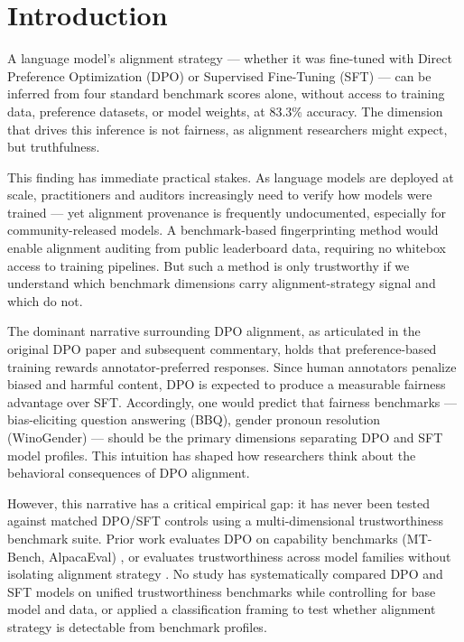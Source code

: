 \section{Introduction}

A language model's alignment strategy --- whether it was fine-tuned with Direct Preference
Optimization (DPO) or Supervised Fine-Tuning (SFT) --- can be inferred from four standard
benchmark scores alone, without access to training data, preference datasets, or model
weights, at 83.3\% accuracy. The dimension that drives this inference is not fairness,
as alignment researchers might expect, but truthfulness.

This finding has immediate practical stakes. As language models are deployed at scale,
practitioners and auditors increasingly need to verify how models were trained --- yet
alignment provenance is frequently undocumented, especially for community-released models.
A benchmark-based fingerprinting method would enable alignment auditing from public
leaderboard data, requiring no whitebox access to training pipelines. But such a method
is only trustworthy if we understand which benchmark dimensions carry alignment-strategy
signal and which do not.

The dominant narrative surrounding DPO alignment, as articulated in the original DPO
paper \cite{Rafailov2023Direct} and subsequent commentary, holds that preference-based
training rewards annotator-preferred responses. Since human annotators penalize biased
and harmful content, DPO is expected to produce a measurable fairness advantage over
SFT. Accordingly, one would predict that fairness benchmarks --- bias-eliciting question
answering (BBQ), gender pronoun resolution (WinoGender) --- should be the primary
dimensions separating DPO and SFT model profiles. This intuition has shaped how
researchers think about the behavioral consequences of DPO alignment.

However, this narrative has a critical empirical gap: it has never been tested against
matched DPO/SFT controls using a multi-dimensional trustworthiness benchmark suite.
Prior work evaluates DPO on capability benchmarks (MT-Bench, AlpacaEval) \cite{Rafailov2023Direct},
or evaluates trustworthiness across model families without isolating alignment
strategy \cite{Wang2023DecodingTrust,Liang2022Holistic}. No study has systematically compared
DPO and SFT models on unified trustworthiness benchmarks while controlling for base
model and data, or applied a classification framing to test whether alignment strategy
is detectable from benchmark profiles.

